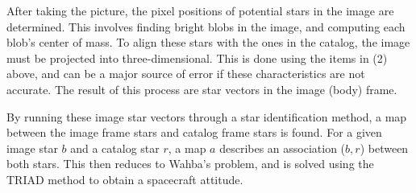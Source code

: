 After taking the picture, the pixel positions of potential stars in the image are determined.
This involves finding bright blobs in the image, and computing each blob's center of mass.
To align these stars with the ones in the catalog, the image must be projected into three-dimensional.
This is done using the items in (2) above, and can be a major source of error if these
characteristics are not accurate.
The result of this process are star vectors in the image (body) frame.

By running these image star vectors through a star identification method, a map between the image frame stars and
catalog frame stars is found.
For a given image star $b$ and a catalog star $r$, a map $a$ describes an association ($b, r$) between both stars.
This then reduces to Wahba's problem, and is solved using the TRIAD method to obtain a spacecraft attitude.